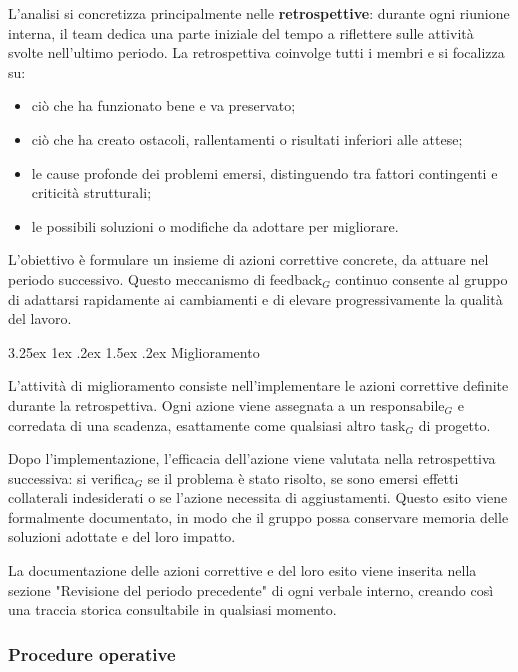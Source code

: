 \documentclass[a4paper, 10pt]{article}
\makeatletter
\renewcommand\paragraph{\@startsection{paragraph}{4}{\z@}%
  {3.25ex \@plus1ex \@minus .2ex}%
  {1.5ex \@plus .2ex}%
  {\normalfont\normalsize\bfseries}}
\makeatother
\begin{document}
L'analisi si concretizza principalmente nelle \textbf{retrospettive}: durante ogni riunione interna, il team dedica una parte iniziale del tempo a riflettere sulle attività svolte nell'ultimo periodo. La retrospettiva coinvolge tutti i membri e si focalizza su:
\begin{itemize}
    \item ciò che ha funzionato bene e va preservato;
    \item ciò che ha creato ostacoli, rallentamenti o risultati inferiori alle attese;
    \item le cause profonde dei problemi emersi, distinguendo tra fattori contingenti e criticità strutturali;
    \item le possibili soluzioni o modifiche da adottare per migliorare.
\end{itemize}

L'obiettivo è formulare un insieme di azioni correttive concrete, da attuare nel periodo successivo. Questo meccanismo di feedback$_G$ continuo consente al gruppo di adattarsi rapidamente ai cambiamenti e di elevare progressivamente la qualità del lavoro.

\paragraph{Miglioramento}

L'attività di miglioramento consiste nell'implementare le azioni correttive definite durante la retrospettiva. Ogni azione viene assegnata a un responsabile$_G$ e corredata di una scadenza, esattamente come qualsiasi altro task$_G$ di progetto.

Dopo l'implementazione, l'efficacia dell'azione viene valutata nella retrospettiva successiva: si verifica$_G$ se il problema è stato risolto, se sono emersi effetti collaterali indesiderati o se l'azione necessita di aggiustamenti. Questo esito viene formalmente documentato, in modo che il gruppo possa conservare memoria delle soluzioni adottate e del loro impatto.

La documentazione delle azioni correttive e del loro esito viene inserita nella sezione "Revisione del periodo precedente" di ogni verbale interno, creando così una traccia storica consultabile in qualsiasi momento.

\subsubsection{Procedure operative}
\label{subsubsec:procedure_miglioramento}
\end{document}
